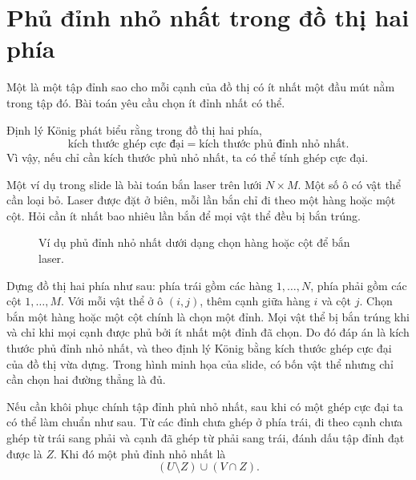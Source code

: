 \documentclass[11pt]{article}
\begin{document}
\section{Phủ đỉnh nhỏ nhất trong đồ thị hai phía}

Một  là một tập đỉnh sao cho mỗi cạnh của đồ thị có ít nhất một
đầu mút nằm trong tập đó. Bài toán  yêu cầu chọn ít
đỉnh nhất có thể.

Định lý König phát biểu rằng trong đồ thị hai phía,
\[
  \text{kích thước ghép cực đại}
  =
  \text{kích thước phủ đỉnh nhỏ nhất}.
\]
Vì vậy, nếu chỉ cần kích thước phủ nhỏ nhất, ta có thể tính ghép cực đại.

Một ví dụ trong slide là bài toán bắn laser trên lưới $N\times M$. Một số ô có
vật thể cần loại bỏ. Laser được đặt ở biên, mỗi lần bắn chỉ đi theo một hàng
hoặc một cột. Hỏi cần ít nhất bao nhiêu lần bắn để mọi vật thể đều bị bắn
trúng.

\begin{figure}[ht]
\centering
{}
\caption{Ví dụ phủ đỉnh nhỏ nhất dưới dạng chọn hàng hoặc cột để bắn laser.}
\end{figure}

Dựng đồ thị hai phía như sau: phía trái gồm các hàng $1,\ldots,N$, phía phải
gồm các cột $1,\ldots,M$. Với mỗi vật thể ở ô $(i,j)$, thêm cạnh giữa hàng $i$
và cột $j$. Chọn bắn một hàng hoặc một cột chính là chọn một đỉnh. Mọi vật thể
bị bắn trúng khi và chỉ khi mọi cạnh được phủ bởi ít nhất một đỉnh đã chọn.
Do đó đáp án là kích thước phủ đỉnh nhỏ nhất, và theo định lý König bằng kích
thước ghép cực đại của đồ thị vừa dựng. Trong hình minh họa của slide, có bốn
vật thể nhưng chỉ cần chọn hai đường thẳng là đủ.

Nếu cần khôi phục chính tập đỉnh phủ nhỏ nhất, sau khi có một ghép cực đại ta
có thể làm chuẩn như sau. Từ các đỉnh chưa ghép ở phía trái, đi theo cạnh chưa
ghép từ trái sang phải và cạnh đã ghép từ phải sang trái, đánh dấu tập đỉnh
đạt được là $Z$. Khi đó một phủ đỉnh nhỏ nhất là
\[
  (U\setminus Z)\cup (V\cap Z).
\]
\end{document}
